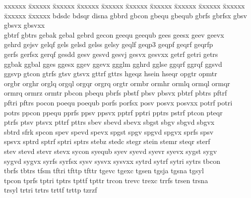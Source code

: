 \begin{tabbing}
xxxxxx \= 
xxxxxx \= 
xxxxxx \=
xxxxxx \= 
xxxxxx \=
xxxxxx \=
xxxxxx \=
xxxxxx \=
xxxxxx \=
xxxxxx \=
xxxxxx \=
xxxxxx \kill
bdsdc \> 
bdsqr \> 
disna \> 
gbbrd \> 
gbcon \>
gbequ \> 
gbequb \> 
gbrfs \> 
gbrfsx \>
gbsv \>
gbsvx \> 
gbsvxx \\
gbtrf \>
gbtrs \> 
gebak \> 
gebal \> 
gebrd \> 
gecon \> 
geequ \> 
geequb \> 
gees \> 
geesx \> 
geev \> 
geevx \\
gehrd \> 
gejsv \>
gelqf \>
gels \>
gelsd \>
gelss \>
gelsy \> 
geqlf \>
geqp3 \>
geqpf \>
geqrf \>
geqrfp \\
gerfs \>
gerfsx \>
gerqf \>
gesdd \>
gesv \>
gesvd \>
gesvj \>
gesvx \>
gesvxx \>
getrf \>
getri \>
getrs \\
ggbak \>
ggbal \> 
gges \>
ggesx \>
ggev \>
ggevx \>
ggglm \>
gghrd \>
gglse \>
ggqrf \>
ggrqf \>
ggsvd \\
ggsvp \>
gtcon \>
gtrfs \>
gtsv \>
gtsvx \>
gttrf \>
gttrs \>
hgeqz \>
hsein \>
hseqr \>
opgtr \>
opmtr \\
orgbr \>
orghr \>
orglq \>
orgql \>
orgqr \>
orgrq \>
orgtr \>
ormbr \>
ormhr \>
ormlq \>
ormql \>
ormqr \\
ormrq \>
ormrz \>
ormtr \>
pbcon \>
pbequ \>
pbrfs \>
pbstf \>
pbsv \>
pbsvx \>
pbtrf \>
pbtrs \>
pftrf \\
pftri \>
pftrs \>
pocon \>
poequ \>
poequb \>
porfs \>
porfsx \>
posv \>
posvx \>
posvxx \>
potrf \>
potri \\
potrs \>
ppcon \>
ppequ \>
pprfs \>
ppsv \>
ppsvx \>
pptrf \>
pptri \>
pptrs \>
pstrf \>
ptcon \>
pteqr \\
ptrfs \>
ptsv \>
ptsvx \>
pttrf \>
pttrs \>
sbev \>
sbevd \>
sbevx \>
sbgst \>
sbgv \>
sbgvd \>
sbgvx \\
sbtrd \>
sfrk \>
spcon \>
spev \>
spevd \>
spevx \>
spgst \>
spgv \>
spgvd \>
spgvx \>
sprfs \>
spsv \\
spsvx \>
sptrd \>
sptrf \>
sptri \>
sptrs \>
stebz \>
stedc \>
stegr \>
stein \>
stemr \>
steqr \>
sterf \\
stev \>
stevd \>
stevr \>
stevx \>
sycon \>
syequb \>
syev \>
syevd \>
syevr \>
syevx \>
sygst \>
sygv \\
sygvd \>
sygvx \>
syrfs \>
syrfsx \>
sysv \>
sysvx \>
sysvxx \>
sytrd \>
sytrf \>
sytri \>
sytrs \>
tbcon \\
tbrfs \>
tbtrs \>
tfsm \>
tftri \> 
tfttp \>
tfttr \>
tgevc \>
tgexc \>
tgsen \>
tgsja \>
tgsna \>
tgsyl \\
tpcon \>
tprfs \>
tptri \>
tptrs \>
tpttf \>
tpttr \>
trcon \>
trevc \>
trexc \>
trrfs \>
trsen \>
trsna \\
trsyl \>
trtri \> 
trtrs \>
trttf \>
trttp \>
tzrzf \\
\end{tabbing}

